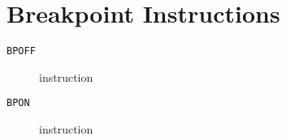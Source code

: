 \section{Breakpoint Instructions}
\begin{description}
\item[\texttt{BPOFF}] instruction\\

\end{description}
\clearpage
\begin{description}
\item[\texttt{BPON}] instruction\\

\end{description}
\clearpage
